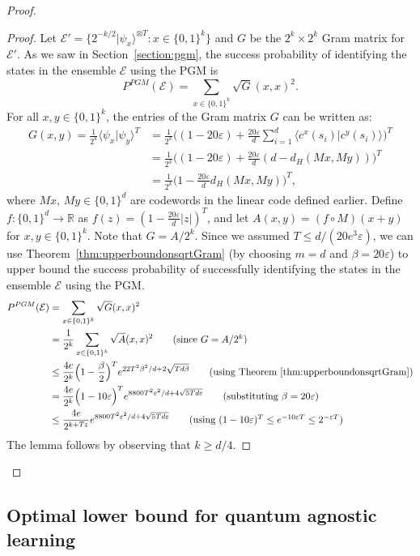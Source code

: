 \documentclass[twoside,11pt]{article}
\newcommand{\eps}{\varepsilon}
\newcommand{\ket}[1]{|#1\rangle}
\newcommand{\ip}[2]{\langle #1 | #2 \rangle}
\newcommand{\E}{\mathcal{E}}
\newcommand{\R}{\ensuremath{\mathbb{R}}}
\def\01{\{0,1\}}
\begin{document}
\begin{proof}
	\begin{proof}
		Let $\E'=\{2^{-k/2}\ket{\psi_x}^{\otimes T}:x\in \01^k\}$ and $G$ be the $2^k\times 2^k$ Gram matrix for $\E'$.  As we saw in Section~\ref{section:pgm}, the success probability of identifying the states in the ensemble $\E$ using the PGM is
		$$
		P^{PGM}(\E)=\sum_{x\in \01^k} \sqrt{G}({x,x})^2.
		$$
		For all $x,y\in \01^k$, the entries of the Gram matrix $G$ can be written as:
		\begin{align*}
		G(x,y)=\frac{1}{2^k}\ip{\psi_x}{\psi_y}^T&=\frac{1}{2^k}\Big( (1-20\eps)+\frac{20\eps}{d} \sum_{i=1}^d \ip{c^x(s_i)}{c^y(s_i)}\Big)^T \\
		&=\frac{1}{2^k} \Big((1-20\eps)+\frac{20\eps}{d} (d-d_H(Mx,My))\Big)^T\\
		&=\frac{1}{2^k}\Big(1-\frac{20\eps }{d}d_H(Mx,My)\Big)^T,
		\end{align*}
		where $Mx$, $My \in \01^{d}$ are codewords  in the linear code defined earlier. Define $f:\01^{d}\rightarrow \R$ as $f(z)=(1-\frac{20\eps}{d}|z|)^T$, and let $A(x,y)=(f\circ M)(x+ y)$ for $x,y\in \01^k$. Note that $G=A/2^k$. Since we assumed $T\leq d/(20e^3 \eps)$, we can use Theorem~\ref{thm:upperboundonsqrtGram} (by choosing $m=d$ and $\beta=20\eps$) to upper bound the success probability of successfully identifying the states in the ensemble $\E$ using the PGM. 
		\begin{align*}
		P^{PGM}(\E)&=\sum_{x\in \01^k} \sqrt{G}(x,x)^2 \\
		&=\frac{1}{2^k}\sum_{x\in \01^k} \sqrt{A}(x,x)^2 \tag{since $G=A/2^k$}\\
		&\leq  \frac{4e}{2^{k}}\Big(1-\frac{\beta}{2}\Big)^{T} e^{22T^2\beta^2/d+2\sqrt{Td\beta}}  \tag{using Theorem~\ref{thm:upperboundonsqrtGram}} \\
		&=  \frac{4e}{2^{k}}\Big(1-10\eps\Big)^{T} e^{8800T^2\eps^2/d+4\sqrt{5Td\eps}}     \tag{substituting $\beta=20\eps$}\\
		&\leq  \frac{4e}{2^{k+T\eps}}e^{8800T^2\eps^2/d+4\sqrt{5Td\eps}}   \tag{using $(1-10\eps)^T\leq e^{-10\eps T}\leq 2^{-\eps T}$}\\
		\end{align*}
		The lemma follows by observing that $k\geq d/4$.
	\end{proof}

\end{proof}

\subsection{Optimal lower bound for quantum agnostic learning}
\end{document}
